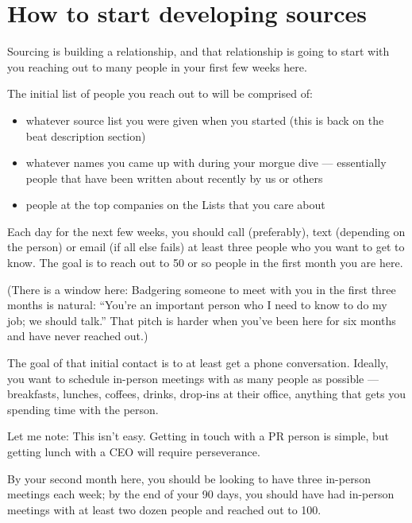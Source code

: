 \documentclass[
  11pt,
  american,
  letterpaperpaper,
  extrafontsizes,onecolumn,openright
  ]{memoir}
\providecommand{\tightlist}{%
  \setlength{\itemsep}{0pt}\setlength{\parskip}{0pt}}
\begin{document}
\hypertarget{how-to-start-developing-sources}{%
\section*{How to start developing sources}\label{how-to-start-developing-sources}}

Sourcing is building a relationship, and that relationship is going to start with you reaching out to many people in your first few weeks here.

The initial list of people you reach out to will be comprised of:

\begin{itemize}
\tightlist
\item
  whatever source list you were given when you started (this is back on the beat description section)
\item
  whatever names you came up with during your morgue dive --- essentially people that have been written about recently by us or others
\item
  people at the top companies on the Lists that you care about
\end{itemize}

Each day for the next few weeks, you should call (preferably), text (depending on the person) or email (if all else fails) at least three people who you want to get to know. The goal is to reach out to 50 or so people in the first month you are here.

(There is a window here: Badgering someone to meet with you in the first three months is natural: \enquote{You're an important person who I need to know to do my job; we should talk.} That pitch is harder when you've been here for six months and have never reached out.)

The goal of that initial contact is to at least get a phone conversation. Ideally, you want to schedule in-person meetings with as many people as possible --- breakfasts, lunches, coffees, drinks, drop-ins at their office, anything that gets you spending time with the person.

Let me note: This isn't easy. Getting in touch with a PR person is simple, but getting lunch with a CEO will require perseverance.

By your second month here, you should be looking to have three in-person meetings each week; by the end of your 90 days, you should have had in-person meetings with at least two dozen people and reached out to 100.
\end{document}
